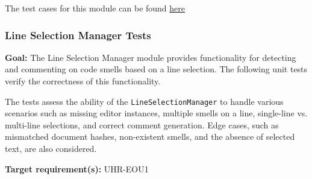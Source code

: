 \documentclass[12pt, titlepage]{article}
\begin{document}
\noindent The test cases for this module can be found \href{https://github.com/ssm-lab/capstone--sco-vs-code-plugin/blob/plugin-multi-file/test/ui/hoverManager.test.ts}{here}



\subsubsection{Line Selection Manager Tests}

\textbf{Goal:} The Line Selection Manager module provides functionality for detecting and commenting on code smells based on a line selection. The following unit tests verify the correctness of this functionality.

The tests assess the ability of the \texttt{LineSelectionManager} to handle various scenarios such as missing editor instances, multiple smells on a line, single-line vs. multi-line selections, and correct comment generation. Edge cases, such as mismatched document hashes, non-existent smells, and the absence of selected text, are also considered.

\textbf{Target requirement(s):}  UHR-EOU1 ~\cite{SRS} \\
\end{document}
